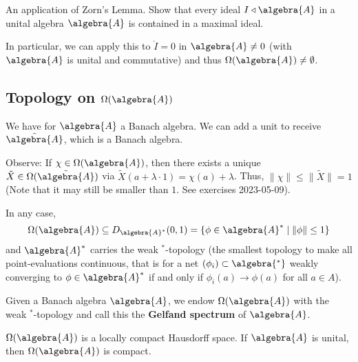 \documentclass[a4paper]{article}
\begin{document}
\begin{exercise}
	An application of Zorn's Lemma. Show that every ideal $I \triangleleft \algebra{A}$ in a unital algebra $\algebra{A}$ is contained in a maximal ideal.
\end{exercise}

In particular, we can apply this to $\ring{I} = 0$ in $\algebra{A} \neq 0$ (with $\algebra{A}$ is unital and commutative) and thus $\Omega(\algebra{A}) \neq \emptyset$.

\subsection*{Topology on $\Omega(\algebra{A})$}

We have for $\algebra{A}$ a Banach algebra. We can add a unit to receive $\tilde{\algebra{A}}$, which is a Banach algebra.

Observe: If $\chi \in \Omega(\algebra{A})$, then there exists a unique $\tilde{X} \in \Omega(\tilde{\algebra{A}})$ via $\tilde{X}(a + \lambda \cdot 1) = \chi(a) + \lambda$. Thus, $\|\chi\| \leq \|\tilde{X}\| = 1$ (Note that it may still be smaller than $1$. See exercises 2023-05-09).

In any case, 
\begin{equation*}
	\Omega(\algebra{A}) \subseteq D_{\algebra{A}^*}(0,1) = \{ \phi \in \algebra{A}^* \mid \| \phi \| \leq 1 \}
\end{equation*}
and $\algebra{A}^*$ carries the weak $^*$-topology (the smallest topology to make all point-evaluations continuous, that is for a net $(\phi_i)  \subset \algebra{^*}$ weakly converging to $\phi \in \algebra{A}^*$ if and only if $\phi_i(a) \to \phi(a)$ for all $a \in A$). 

\begin{definition}
	Given a Banach algebra $\algebra{A}$, we endow $\Omega(\algebra{A})$ with the weak $^*$-topology and call this the \textbf{Gelfand spectrum} of $\algebra{A}$.
\end{definition}

\begin{proposition}
	$\Omega(\algebra{A})$ is a locally compact Hausdorff space. If $\algebra{A}$ is unital, then $\Omega(\algebra{A})$ is compact.
\end{proposition}
\end{document}
